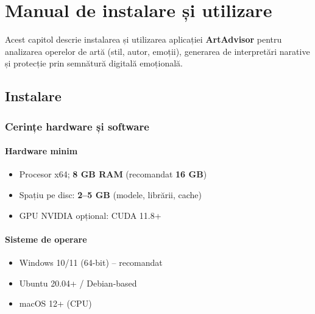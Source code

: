 \newcommand{\AppScreen}[2]{%
  \begin{figure}[H]
    \centering
  \texttt{[image: \#1]}
    \caption{\small #2}
  \end{figure}
}

\chapter{Manual de instalare și utilizare}
\label{ch:install_use}
\pagestyle{fancy}

Acest capitol descrie instalarea și utilizarea aplicației \textbf{ArtAdvisor} pentru analizarea operelor de artă (stil, autor, emoții), generarea de interpretări narative și protecție prin semnătură digitală emoțională.

\section{Instalare}
\subsection{Cerințe hardware și software}
\subsubsection{Hardware minim}
\begin{itemize}[noitemsep,topsep=2pt]
  \item Procesor x64; \textbf{8 GB RAM} (recomandat \textbf{16 GB})
  \item Spațiu pe disc: \textbf{2--5 GB} (modele, librării, cache)
  \item GPU NVIDIA opțional: CUDA 11.8+
\end{itemize}

\subsubsection{Sisteme de operare}
\begin{itemize}[noitemsep,topsep=2pt]
  \item Windows 10/11 (64-bit) -- recomandat
  \item Ubuntu 20.04+ / Debian-based
  \item macOS 12+ (CPU)
\end{itemize}

